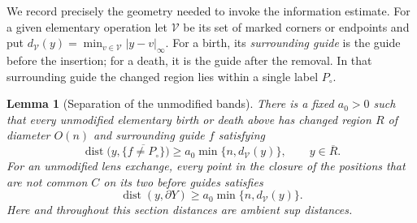 \documentclass[11pt]{article}
\numberwithin{equation}{section}
\newtheorem{lemma}[theorem]{Lemma}
\theoremstyle{definition}
\theoremstyle{remark}
\DeclareMathOperator{\dist}{dist}
\newcommand{\abs}[1]{\lvert #1\rvert}
\begin{document}
We record precisely the geometry needed to invoke the information
estimate.  For a given elementary operation let $\mathcal V$ be its
set of marked corners or endpoints and put
$d_{\mathcal V}(y)=\min_{v\in\mathcal V}\abs{y-v}_\infty$.
For a birth, its \emph{surrounding guide} is the guide before the
insertion; for a death, it is the guide after the removal.  In that
surrounding guide the changed region lies within a single label
$P_\circ$.

\begin{lemma}[Separation of the unmodified bands]
\label{lem:geometry-angular}
There is a fixed $a_0>0$ such that every unmodified elementary birth or
death above has changed region $R$ of diameter $O(n)$ and surrounding
guide $f$ satisfying
\begin{equation}
 \dist\bigl(y,\overline{\{f\ne P_\circ\}}\bigr)
 \ge a_0\min\{n,d_{\mathcal V}(y)\},
 \qquad y\in\overline R.
 \label{eq:geometry-birth-clearance}
\end{equation}
For an unmodified lens exchange, every point in the closure of the
positions that are not common $C$ on its two before guides satisfies
\begin{equation}
 \dist(y,\partial Y)
 \ge a_0\min\{n,d_{\mathcal V}(y)\}.
 \label{eq:geometry-exchange-clearance}
\end{equation}
Here and throughout this section distances are ambient sup distances.
\end{lemma}
\end{document}

